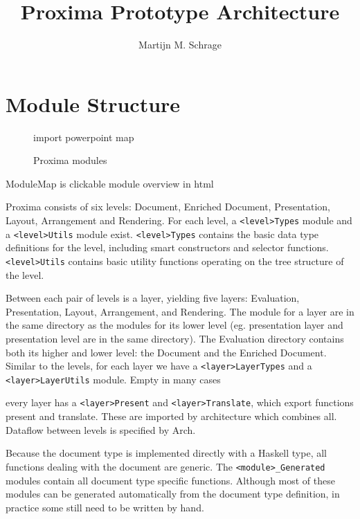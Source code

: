 \documentclass[]{article}
\begin{document}
\title{Proxima Prototype Architecture}
\author{Martijn M. Schrage}
\maketitle

\section{Module Structure}
\begin{figure}
\begin{tiny}
\begin{center}
\begin{center}
import powerpoint map
\end{center}\caption{Proxima modules}
\end{center}
\end{tiny}
\end{figure}



ModuleMap is clickable module overview in html

Proxima consists of six levels: Document, Enriched Document, Presentation, Layout, Arrangement and Rendering. For each level, a \verb|<level>Types| module and a \verb|<level>Utils| module exist. \verb|<level>Types| contains the basic data type definitions for the level, including smart constructors and selector functions. \verb|<level>Utils| contains basic utility functions operating on the tree structure of the level.

Between each pair of levels is a layer, yielding five layers: Evaluation, Presentation, Layout, Arrangement, and Rendering. The module for a layer are in the same directory as the modules for its lower level (eg. presentation layer and presentation level are in the same directory). The Evaluation directory contains both its higher and lower level: the Document and the Enriched Document. Similar to the levels, for each layer we have a \verb|<layer>LayerTypes| and a \verb|<layer>LayerUtils| module. Empty in many cases

every layer has a \verb|<layer>Present| and \verb|<layer>Translate|, which export functions present and translate. These are imported by architecture which combines all. Dataflow between levels is specified by Arch.

Because the document type is implemented directly with a Haskell type, all functions dealing with the document are generic. The \verb|<module>_Generated| modules contain all document type specific functions. Although most of these modules can be generated automatically from the document type definition, in practice some still need to be written by hand.
\end{document}
